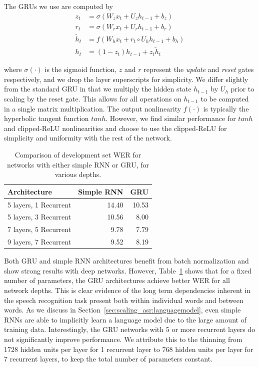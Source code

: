 The GRUs we use are computed by 
\begin{equation*}
\begin{aligned}
z_t &= \sigma(W_z x_t + U_z h_{t-1} + b_z) \\
r_t &= \sigma(W_r x_t + U_r h_{t-1} + b_r) \\
\tilde{h}_t &= f(W_h x_t + r_t \circ U_h h_{t-1} + b_h) \\
h_t &= (1 - z_t) h_{t-1} + z_t \tilde{h}_t
\end{aligned}
\end{equation*}

where $\sigma(\cdot)$ is the sigmoid function, $z$ and $r$ represent the
\emph{update} and \emph{reset} gates respectively, and we drop the layer
superscripts for simplicity. We differ slightly from the standard GRU in that
we multiply the hidden state $h_{t-1}$ by $U_h$ prior to scaling by the reset
gate. This allows for all operations on $h_{t-1}$ to be computed in a single
matrix multiplication. The output nonlinearity $f(\cdot)$ is typically the
hyperbolic tangent function $tanh$. However, we find similar performance for
$tanh$ and clipped-ReLU nonlinearities and choose to use the clipped-ReLU for
simplicity and uniformity with the rest of the network.

\begin{table}
\centering
\begin{tabular}{l  r  r}
\toprule
Architecture &  Simple RNN & GRU \\
\midrule
5 layers, 1 Recurrent   & 14.40 & 10.53  \\
5 layers, 3 Recurrent   & 10.56 & 8.00  \\
7 layers, 5 Recurrent   & 9.78 & 7.79  \\
9 layers, 7 Recurrent   & 9.52 & 8.19  \\
\bottomrule
\end{tabular}
\caption{Comparison of development set WER for networks with either simple RNN
         or GRU, for various depths.}
\label{table:scaling_asr:rnns}
\end{table}

Both GRU and simple RNN architectures benefit from batch normalization and show
strong results with deep networks. However, Table~\ref{table:scaling_asr:rnns}
shows that for a fixed number of parameters, the GRU architectures achieve
better WER for all network depths. This is clear evidence of the long term
dependencies inherent in the speech recognition task present both within
individual words and between words. As we discuss in
Section~\ref{sec:scaling_asr:languagemodel}, even simple RNNs are able to
implicitly learn a language model due to the large amount of training data.
Interestingly, the GRU networks with 5 or more recurrent layers do not
significantly improve performance. We attribute this to the thinning from 1728
hidden units per layer for 1 recurrent layer to 768 hidden units per layer for
7 recurrent layers, to keep the total number of parameters constant.

